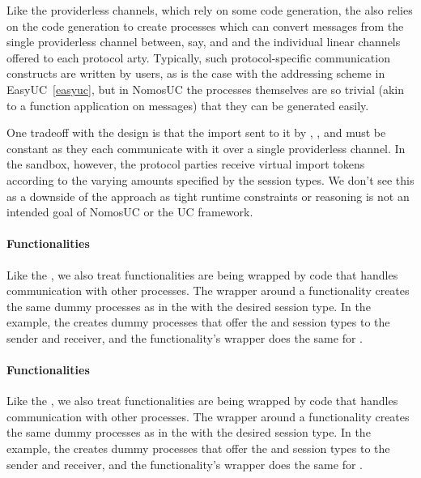 Like the providerless channels, which rely on some code generation, the \partywrapper also relies on the code generation to create processes which can convert messages from the single providerless channel between, say, \partywrapper and \F  and the individual linear channels offered to each protocol arty.
Typically, such protocol-specific communication constructs are written by users, as is the case with the addressing scheme in EasyUC~\ref{easyuc}, but in NomosUC the processes themselves are so trivial (akin to a function application on messages) that they can be generated easily.

One tradeoff with the \partywrapper design is that the import sent to it by \F, \Z, and \A must be constant as they each communicate with it over a single providerless channel.  
In the sandbox, however, the protocol parties receive virtual import tokens according to the varying amounts specified by the session types.
We don't see this as a downside of the approach as tight runtime constraints or reasoning is not an intended goal of NomosUC or the UC framework.

\paragraph{Functionalities}
Like the \partywrapper, we also treat functionalities are being wrapped by code that handles communication with other processes. The wrapper around a functionality creates the same dummy processes as in the \partywrapper with the desired session type.
In the \Fcom example, the \partywrapper creates dummy processes that offer the  and  session types to the sender and receiver, and the functionality's wrapper does the same for \Fcom. 

\paragraph{Functionalities}
Like the \partywrapper, we also treat functionalities are being wrapped by code that handles communication with other processes. The wrapper around a functionality creates the same dummy processes as in the \partywrapper with the desired session type.
In the \Fcom example, the \partywrapper creates dummy processes that offer the  and  session types to the sender and receiver, and the functionality's wrapper does the same for \Fcom. 



